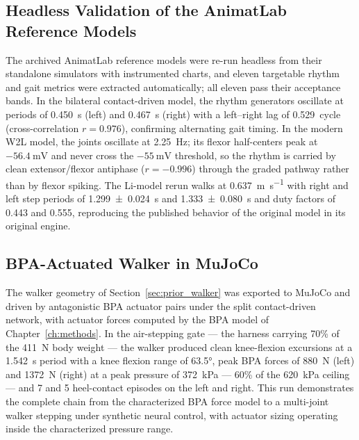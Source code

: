 \subsection{Headless Validation of the AnimatLab Reference Models}\label{sec:animatlab_validation}

The archived AnimatLab reference models were re-run headless from their standalone simulators with instrumented charts, and eleven targetable rhythm and gait metrics were extracted automatically; all eleven pass their acceptance bands. In the bilateral contact-driven model, the rhythm generators oscillate at periods of \qty{0.450}{\second} (left) and \qty{0.467}{\second} (right) with a left--right lag of \qty{0.529}{cycle} (cross-correlation $r = 0.976$), confirming alternating gait timing. In the modern W2L model, the joints oscillate at \qty{2.25}{\Hz}; its flexor half-centers peak at $-\qty{56.4}{\mV}$ and never cross the $-\qty{55}{\mV}$ threshold, so the rhythm is carried by clean extensor/flexor antiphase ($r = -0.996$) through the graded pathway rather than by flexor spiking. The Li-model rerun \citep{li_bipedal_2017} walks at \qty{0.637}{\meter\per\second} with right and left step periods of \qty{1.299 \pm 0.024}{\second} and \qty{1.333 \pm 0.080}{\second} and duty factors of 0.443 and 0.555, reproducing the published behavior of the original model in its original engine.

\subsection{BPA-Actuated Walker in MuJoCo}\label{sec:bpa_walker}

The walker geometry of Section~\ref{sec:prior_walker} was exported to MuJoCo and driven by antagonistic BPA actuator pairs under the split contact-driven network, with actuator forces computed by the BPA model of Chapter~\ref{ch:methods}. In the air-stepping gate --- the harness carrying 70\% of the \qty{411}{\N} body weight --- the walker produced clean knee-flexion excursions at a \qty{1.542}{\second} period with a knee flexion range of \ang{63.5}, peak BPA forces of \qty{880}{\N} (left) and \qty{1372}{\N} (right) at a peak pressure of \qty{372}{\kPa} --- 60\% of the \qty{620}{\kPa} ceiling --- and 7 and 5 heel-contact episodes on the left and right. This run demonstrates the complete chain from the characterized BPA force model to a multi-joint walker stepping under synthetic neural control, with actuator sizing operating inside the characterized pressure range.

